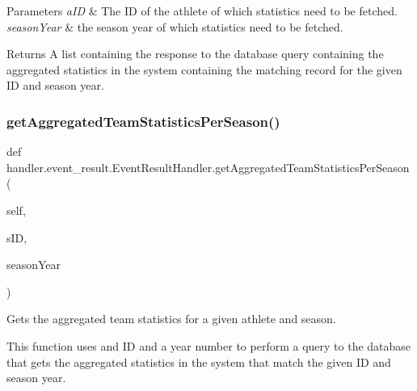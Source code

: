 \begin{DoxyParams}{Parameters}
{\em a\+ID} & The ID of the athlete of which statistics need to be fetched. \\
\hline
{\em season\+Year} & the season year of which statistics need to be fetched.\\
\hline
\end{DoxyParams}
\begin{DoxyReturn}{Returns}
A list containing the response to the database query containing the aggregated statistics in the system containing the matching record for the given ID and season year. 
\end{DoxyReturn}
\mbox{\label{classhandler_1_1event__result_1_1_event_result_handler_a1ed778ff72728bee8d68b58dd0b66763}} 
\subsubsection{\texorpdfstring{get\+Aggregated\+Team\+Statistics\+Per\+Season()}{getAggregatedTeamStatisticsPerSeason()}}
{\footnotesize\ttfamily def handler.\+event\+\_\+result.\+Event\+Result\+Handler.\+get\+Aggregated\+Team\+Statistics\+Per\+Season (\begin{DoxyParamCaption}\item[{}]{self,  }\item[{}]{s\+ID,  }\item[{}]{season\+Year }\end{DoxyParamCaption})}



Gets the aggregated team statistics for a given athlete and season. 

This function uses and ID and a year number to perform a query to the database that gets the aggregated statistics in the system that match the given ID and season year.


